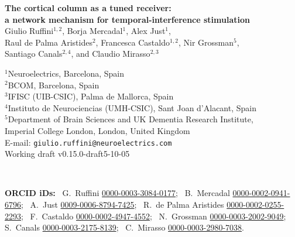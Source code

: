\documentclass[11pt,a4paper]{article}
\newif\ifjne
\newcommand{\paperver}{0.15.0-draft5} %
\begin{document}
\ifjne
\begin{center}
{\LARGE\bfseries The cortical column as a tuned receiver:\\[4pt]
a network mechanism for temporal-interference stimulation}\\[16pt]
{\large Giulio Ruffini$^{1,2}$, Borja Mercadal$^{1}$, Alex Just$^{1}$,\\[2pt]
Raul de Palma Aristides$^{2}$, Francesca Castaldo$^{1,2}$, Nir Grossman$^{5}$,\\[2pt]
Santiago Canals$^{2,4}$, and Claudio Mirasso$^{2,3}$}\\[12pt]
\begin{minipage}{0.86\textwidth}\centering\small
$^{1}$Neuroelectrics, Barcelona, Spain\\
$^{2}$BCOM, Barcelona, Spain\\
$^{3}$IFISC (UIB-CSIC), Palma de Mallorca, Spain\\
$^{4}$Instituto de Neurociencias (UMH-CSIC), Sant Joan d'Alacant, Spain\\
$^{5}$Department of Brain Sciences and UK Dementia Research Institute,\\
Imperial College London, London, United Kingdom\\[6pt]
E-mail: \texttt{giulio.ruffini@neuroelectrics.com}\\[4pt]
Working draft v\paperver{}-10-05
\end{minipage}\\[8pt]
\begin{minipage}{0.86\textwidth}\centering\footnotesize\color{negray}
\textbf{ORCID iDs:}\ %
G.~Ruffini \href{https://orcid.org/0000-0003-3084-0177}{0000-0003-3084-0177};\ %
B.~Mercadal \href{https://orcid.org/0000-0002-0941-6796}{0000-0002-0941-6796};\ %
A.~Just \href{https://orcid.org/0009-0006-8794-7425}{0009-0006-8794-7425};\ %
R.~de Palma Aristides \href{https://orcid.org/0000-0002-0255-2293}{0000-0002-0255-2293};\ %
F.~Castaldo \href{https://orcid.org/0000-0002-4947-4552}{0000-0002-4947-4552};\ %
N.~Grossman \href{https://orcid.org/0000-0003-2002-9049}{0000-0003-2002-9049};\ %
S.~Canals \href{https://orcid.org/0000-0003-2175-8139}{0000-0003-2175-8139};\ %
C.~Mirasso \href{https://orcid.org/0000-0003-2980-7038}{0000-0003-2980-7038}.
\end{minipage}
\end{center}
\end{document}
